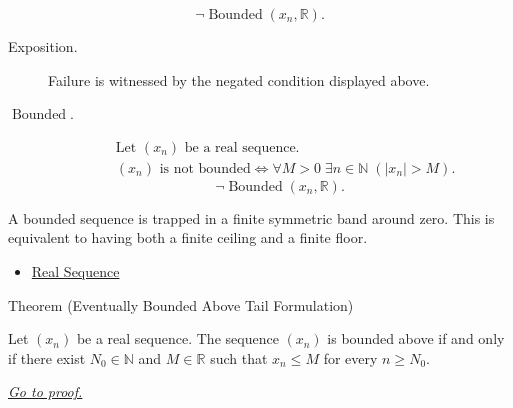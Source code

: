 \begin{remark*}
\[
\neg\operatorname{Bounded}(x_n,\mathbb{R}).
\]
\end{remark*}
\begin{remark*}
\begin{description}
  \item[Exposition.]
Failure is witnessed by the negated condition displayed above.
  \item[\(\operatorname{Bounded}.\)]
\[
\begin{aligned}
&\text{Let } (x_n) \text{ be a real sequence.}\\
&(x_n) \text{ is not bounded}
\Longleftrightarrow
\forall M > 0\;
\exists n \in \mathbb{N}\;(|x_n| > M).
\end{aligned}
\]
\[
\neg\operatorname{Bounded}(x_n,\mathbb{R}).
\]
\end{description}
\end{remark*}

\begin{remark*}[Interpretation]
A bounded sequence is trapped in a finite symmetric band around zero. This is
equivalent to having both a finite ceiling and a finite floor.
\end{remark*}

\begin{dependencies}
\begin{itemize}
  \item \hyperref[def:real-sequence]{Real Sequence}
\end{itemize}
\end{dependencies}


\begin{theorembox}{Theorem (Eventually Bounded Above Tail Formulation)}
\begin{theorem}
\label{thm:eventually-bounded-above-tail-formulation}
Let $(x_n)$ be a real sequence. The sequence $(x_n)$ is bounded above if and
only if there exist $N_0 \in \mathbb{N}$ and $M \in \mathbb{R}$ such that
$x_n \le M$ for every $n \ge N_0$.

\smallskip
\noindent
\hyperref[prf:eventually-bounded-above-tail-formulation]{\textit{Go to proof.}}
\end{theorem}
\end{theorembox}

